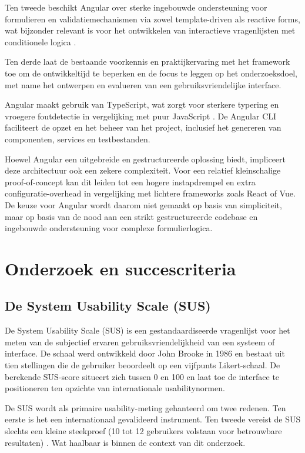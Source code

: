 Ten tweede beschikt Angular over sterke ingebouwde
ondersteuning voor formulieren en validatiemechanismen via zowel template-driven als
reactive forms, wat bijzonder relevant is voor het ontwikkelen van interactieve vragenlijsten
met conditionele logica \autocite{angularForms}.
\medskip 

Ten derde laat de bestaande voorkennis en praktijkervaring met het
framework toe om de ontwikkeltijd te beperken en de focus te leggen op het onderzoeksdoel,
met name het ontwerpen en evalueren van een gebruiksvriendelijke interface.
\medskip

Angular maakt gebruik van TypeScript, wat zorgt voor sterkere typering en vroegere
foutdetectie in vergelijking met puur JavaScript \autocite{typescriptDocs}. De Angular CLI faciliteert de opzet en het
beheer van het project, inclusief het genereren van componenten, services en testbestanden\autocite{angularCli}.
\medskip

Hoewel Angular een uitgebreide en gestructureerde oplossing biedt, impliceert deze architectuur ook een zekere complexiteit. 
Voor een relatief kleinschalige proof-of-concept kan dit leiden tot een hogere instapdrempel en extra configuratie-overhead in vergelijking met lichtere frameworks zoals React of Vue. 
De keuze voor Angular wordt daarom niet gemaakt op basis van simpliciteit, maar op basis van de nood aan een strikt gestructureerde codebase en ingebouwde ondersteuning voor complexe formulierlogica.

\section{Onderzoek en succescriteria}
\label{sec:succescriteria}

\subsection{De System Usability Scale (SUS)}
\label{subsec:sus}

De System Usability Scale (SUS) is een gestandaardiseerde vragenlijst voor het meten van
de subjectief ervaren gebruiksvriendelijkheid van een systeem of interface. De schaal werd
ontwikkeld door John Brooke in 1986 en bestaat uit tien stellingen die de gebruiker beoordeelt
op een vijfpunts Likert-schaal. De berekende SUS-score situeert zich tussen 0 en 100 en laat
toe de interface te positioneren ten opzichte van internationale usabilitynormen.
\medskip

De SUS wordt als primaire usability-meting gehanteerd om twee redenen. 
Ten eerste is het een internationaal gevalideerd instrument.
Ten tweede vereist de SUS slechts een kleine steekproef (10 tot 12 gebruikers volstaan voor betrouwbare resultaten) \autocite{Lewis,Tullis2006}.
Wat haalbaar is binnen de context van dit onderzoek.
\medskip

